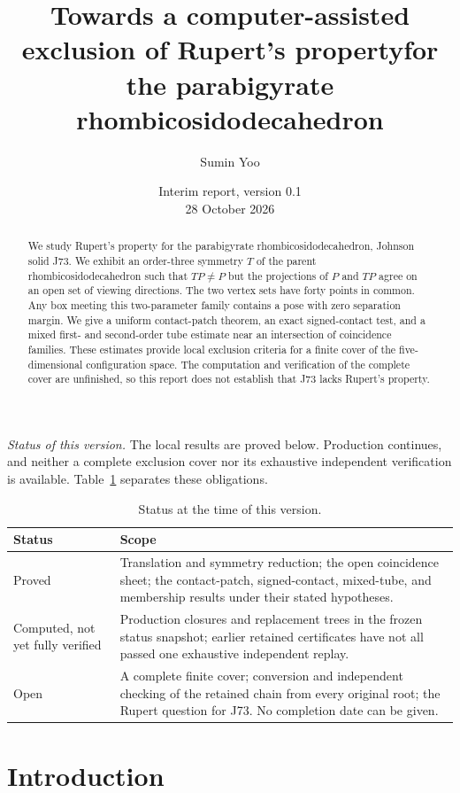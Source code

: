 \documentclass[11pt]{amsart}
\title[J73: coincidence and exclusion certificates]{Towards a computer-assisted exclusion of Rupert's property\newline for the parabigyrate rhombicosidodecahedron}
\author{Sumin Yoo}
\date{Interim report, version 0.1\\28 October 2026}
\theoremstyle{definition}
\theoremstyle{remark}
\begin{document}
\raggedbottom
\begin{abstract}
We study Rupert's property for the parabigyrate rhombicosidodecahedron,
Johnson solid J73. We exhibit an order-three symmetry $T$ of the parent
rhombicosidodecahedron such that $TP\ne P$ but the projections of $P$
and $TP$ agree on an open set of viewing directions. The two vertex sets
have forty points in common. Any box meeting this two-parameter family
contains a pose with zero separation margin. We give a uniform contact-patch theorem,
an exact signed-contact test, and a mixed first- and second-order tube
estimate near an intersection of coincidence families. These estimates
provide local exclusion criteria for a finite cover of the five-dimensional
configuration space. The computation and verification of the complete
cover are unfinished, so this report does not establish that J73 lacks
Rupert's property.
\end{abstract}
\maketitle

\noindent\emph{Status of this version.}
The local results are proved below. Production continues, and neither a
complete exclusion cover nor its exhaustive independent verification is
available. Table~\ref{tab:status} separates these obligations.

\begin{table}[ht]
\centering\small
\caption{Status at the time of this version.}
\label{tab:status}
\begin{tabular}{@{}p{}p{}@{}}
\toprule
Status & Scope\\
\midrule
Proved & Translation and symmetry reduction; the open coincidence
sheet; the contact-patch, signed-contact, mixed-tube, and membership
results under their stated hypotheses.\\
Computed, not yet fully verified & Production closures and replacement
trees in the frozen status snapshot; earlier retained certificates have
not all passed one exhaustive independent replay.\\
Open & A complete finite cover; conversion and independent checking of
the retained chain from every original root; the Rupert question for
J73. No completion date can be given.\\
\bottomrule
\end{tabular}
\end{table}

\section{Introduction}
\end{document}
